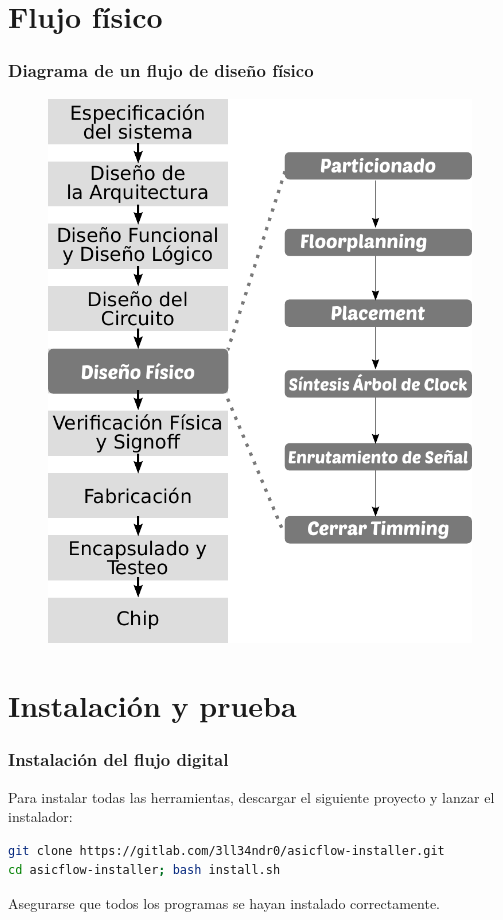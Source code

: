 \documentclass{beamer}
\begin{document}
\section{Flujo físico}
\begin{frame}
  \frametitle{Diagrama de un flujo de diseño físico}

 \begin{figure}[h]
 \centering
 \includegraphics[scale=0.40]{figuras/DisenioFisico.pdf}
 \end{figure}

\end{frame}

\section{Instalación y prueba}
\begin{frame}[fragile]
  \frametitle{Instalación del flujo digital}
  Para instalar todas las herramientas, descargar el siguiente proyecto y lanzar el instalador:
 \begin{scriptsize}
    \begin{lstlisting}[language=bash]
git clone https://gitlab.com/3ll34ndr0/asicflow-installer.git
cd asicflow-installer; bash install.sh
    \end{lstlisting}
 \end{scriptsize}
   
  Asegurarse que todos los programas se hayan instalado correctamente.
\end{frame}
\end{document}
